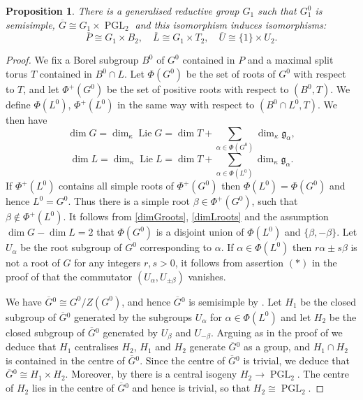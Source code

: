 \documentclass{amsart}
\newtheorem{prop}{Proposition}[section]
\theoremstyle{definition}
\theoremstyle{remark}
\DeclareMathOperator{\PGL}{PGL}
\DeclareMathOperator{\Lie}{Lie}
\newcommand{\Gbar}{\overline{G}}
\newcommand{\Pbar}{\overline{P}}
\newcommand{\Lbar}{\overline{L}}
\newcommand{\Ubar}{\overline{U}}
\begin{document}
\begin{prop}\label{tasho1} 
There is a generalised reductive group $G_1$ such that $G^0_1$ is semisimple, $\Gbar\cong G_1\times \PGL_2$ and this isomorphism induces isomorphisms:
$$ \Pbar\cong G_1\times B_2 
,\quad \Lbar \cong G_1\times T_2,\quad \Ubar \cong \{1\} \times U_2.$$
\end{prop}
\begin{proof} We fix a Borel subgroup $B^0$ of $G^0$ contained in $P$ and a maximal split torus 
$T$ contained in $B^0\cap L$. Let $\Phi(G^0)$ be the set of roots of $G^0$ with respect to $T$,
and let $\Phi^+(G^0)$ be the set of positive roots with respect to $(B^0,T)$. We define 
$\Phi(L^0)$, $\Phi^+(L^0)$ in the same way with respect to $(B^0\cap L^0, T)$. We then have
\begin{equation}\label{dimGroots}
\dim G =\dim_{\kappa} \Lie G = \dim T +\sum_{\alpha\in \Phi(G^0)} \dim_{\kappa} \mathfrak g_{\alpha},
\end{equation}
\begin{equation}\label{dimLroots}
\dim L = \dim_{\kappa} \Lie L = \dim T + \sum_{\alpha\in \Phi(L^0)} \dim_{\kappa} \mathfrak g_{\alpha}.
\end{equation}
If $\Phi^+(L^0)$ contains all simple roots of $\Phi^+(G^0)$ then $\Phi(L^0)=\Phi(G^0)$ and hence $L^0=G^0$. Thus there is a 
simple root $\beta\in \Phi^+(G^0)$, such that $\beta\not\in \Phi^+(L^0)$. It follows from 
\eqref{dimGroots}, \eqref{dimLroots} and the assumption $\dim G-\dim L=2$ that $\Phi(G^0)$ is a disjoint union of $\Phi(L^0)$ and $\{\beta, -\beta\}$. Let $U_{\alpha}$ be the root subgroup of $G^0$ corresponding to $\alpha$. If $\alpha\in \Phi(L^0)$ then $r \alpha \pm s\beta$ is not a root of $G$ for any integers $r, s>0$, 
it follows from assertion $(\ast)$ in the proof of \cite[14.5]{borel} that the commutator $(U_{\alpha}, U_{\pm \beta})$ vanishes.  

We have $\Gbar{}^0\cong G^0/Z(G^0)$, and hence $\Gbar{}^0$ is semisimple by \cite[Corollary 14.2(a)]{borel}. Let $H_1$ be the closed subgroup of $\Gbar{}^0$ generated by the subgroups $U_{\alpha}$ for 
$\alpha\in \Phi(L^0)$ and let $H_2$ be the closed subgroup of $\Gbar{}^0$ generated by $U_{\beta}$ and $U_{-\beta}$. Arguing as in the proof of \cite[Proposition 14.2 (2)]{borel} we deduce that 
$H_1$ centralises $H_2$, $H_1$ and $H_2$ generate $\Gbar{}^0$ as a group, and $H_1\cap H_2$ is contained 
in the centre of $\Gbar{}^0$. Since the centre of $\Gbar{}^0$ is trivial, we deduce that 
$\Gbar{}^0\cong H_1\times H_2$. Moreover, by \cite[Lemma 1.2.3]{bcnrd} there is a central isogeny 
$H_2\rightarrow \PGL_2$. The centre of $H_2$ lies in the centre of $\Gbar{}^0$ and hence
is trivial, so that $H_2\cong \PGL_2$.


\end{proof}
\end{document}
